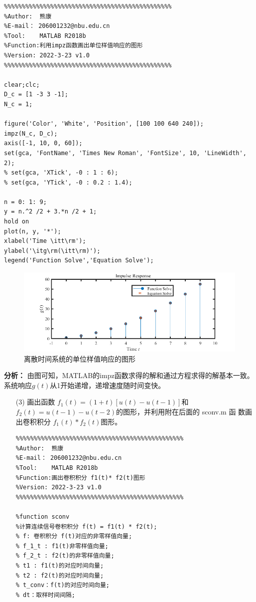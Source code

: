 \documentclass[UTF8,AutoFakeBold]{ctexart}
\begin{document}
\begin{enumerate}
\begin{enumerate}
			\begin{lstlisting}
%%%%%%%%%%%%%%%%%%%%%%%%%%%%%%%%%%%%%%%%%%%%%%% 
%Author:  熊康
%E-mail： 206001232@nbu.edu.cn
%Tool:    MATLAB R2018b
%Function:利用impz函数画出单位样值响应的图形
%Version: 2022-3-23 v1.0
%%%%%%%%%%%%%%%%%%%%%%%%%%%%%%%%%%%%%%%%%%%%%%%

clear;clc;
D_c = [1 -3 3 -1];
N_c = 1;

figure('Color', 'White', 'Position', [100 100 640 240]);
impz(N_c, D_c);
axis([-1, 10, 0, 60]);
set(gca, 'FontName', 'Times New Roman', 'FontSize', 10, 'LineWidth', 2);
% set(gca, 'XTick', -0 : 1 : 6);
% set(gca, 'YTick', -0 : 0.2 : 1.4);

n = 0: 1: 9;
y = n.^2 /2 + 3.*n /2 + 1;
hold on
plot(n, y, '*');
xlabel('Time \itt\rm');
ylabel('\itg\rm(\itt\rm)');
legend('Function Solve','Equation Solve');
				\end{lstlisting}
				\begin{figure}[H]
					\centering
					\includegraphics[scale=0.6]{./figures/photo5.png}
					\caption{离散时间系统的单位样值响应的图形}
				\end{figure}

				\textbf{\songti 分析：} 由图可知，MATLAB的impz函数求得的解和通过方程求得的解基本一致。系统响应$g(t)$从1开始递增，递增速度随时间变快。
		\end{enumerate}


		\begin{enumerate}
			\item[(3)] 画出函数 $f_1(t)=(1+t)[u(t)-u(t-1)]$和 $f_2(t)=u(t-1)-u(t-2)$的图形，并利用附在后面的 sconv.m 函
			数画出卷积积分 $f_1(t)* f_2(t)$图形。
		
			\begin{lstlisting}
%%%%%%%%%%%%%%%%%%%%%%%%%%%%%%%%%%%%%%%%%%%%%%% 
%Author:  熊康
%E-mail： 206001232@nbu.edu.cn
%Tool:    MATLAB R2018b
%Function:画出卷积积分 f1(t)* f2(t)图形
%Version: 2022-3-23 v1.0
%%%%%%%%%%%%%%%%%%%%%%%%%%%%%%%%%%%%%%%%%%%%%%%

%function sconv
%计算连续信号卷积积分 f(t) = f1(t) * f2(t);
% f: 卷积积分 f(t)对应的非零样值向量;
% f_1_t : f1(t)非零样值向量;
% f_2_t : f2(t)的非零样值向量;
% t1 : f1(t)的对应时间向量;
% t2 : f2(t)的对应时间向量;
% t_conv：f(t)的对应时间向量;
% dt：取样时间间隔;


\end{lstlisting}
\end{enumerate}
\end{enumerate}
\end{document}

